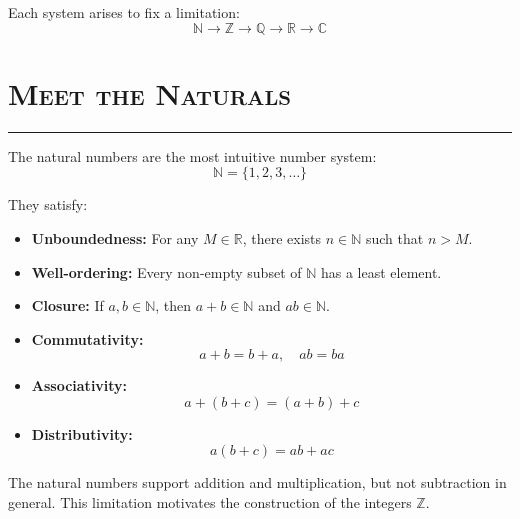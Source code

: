 \documentclass[11pt]{article}
\newcommand{\N}{\mathbb{N}}
\newcommand{\Z}{\mathbb{Z}}
\newcommand{\Q}{\mathbb{Q}}
\newcommand{\R}{\mathbb{R}}
\newcommand{\C}{\mathbb{C}}
\newcommand{\sepline}{
    \vspace{0.5em}
    \hrule
    \vspace{1em}
}
\begin{document}
\begin{remarkbox}
Each system arises to fix a limitation:
\[
\N \rightarrow \Z \rightarrow \Q \rightarrow \R \rightarrow \C
\]
\end{remarkbox}


\section*{\textsc{Meet the Naturals}}
\sepline

\begin{theorybox}

The natural numbers are the most intuitive number system:
\[
\N = \{1,2,3,\dots\}
\]

They satisfy:

\begin{itemize}
    \item \textbf{Unboundedness:} For any $M \in \R$, there exists $n \in \N$ such that $n > M$.
    
    \item \textbf{Well-ordering:} Every non-empty subset of $\N$ has a least element.
    
    \item \textbf{Closure:} If $a,b \in \N$, then $a+b \in \N$ and $ab \in \N$.
    
    \item \textbf{Commutativity:}
    \[
    a+b = b+a, \quad ab = ba
    \]
    
    \item \textbf{Associativity:}
    \[
    a+(b+c) = (a+b)+c
    \]
    
    \item \textbf{Distributivity:}
    \[
    a(b+c) = ab + ac
    \]
\end{itemize}

\end{theorybox}

\begin{center}
\end{center}

\begin{remarkbox}
The natural numbers support addition and multiplication, but not subtraction in general. 
This limitation motivates the construction of the integers $\Z$.
\end{remarkbox}
\end{document}
